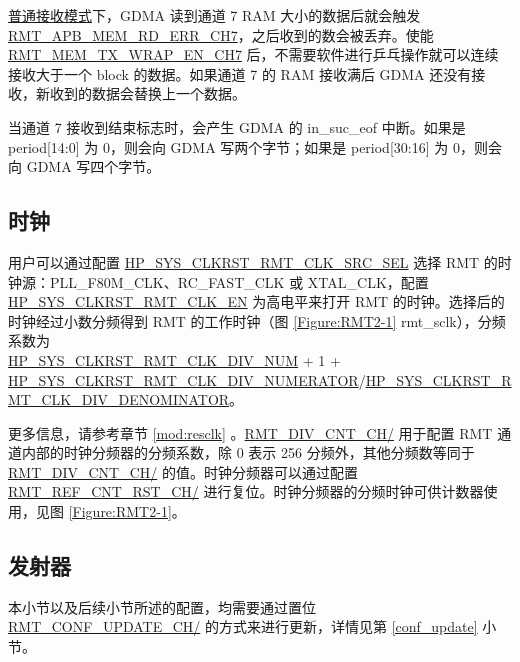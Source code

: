 \documentclass[main\_\_CN.tex]{subfiles}
\begin{document}
\hyperref[sec:normal-rx-mode]{普通接收模式}下，GDMA 读到通道 7 RAM 大小的数据后就会触发 \hyperref[fielddesc:RMTAPBMEMRDERRCHM]{RMT\_APB\_MEM\_RD\_ERR\_CH7}，之后收到的数会被丢弃。使能 \hyperref[fielddesc:RMTMEMRXWRAPENCHM]{RMT\_MEM\_TX\_WRAP\_EN\_CH7} 后，不需要软件进行乒乓操作就可以连续接收大于一个 block 的数据。如果通道 7 的 RAM 接收满后 GDMA 还没有接收，新收到的数据会替换上一个数据。

\begin{tiplisting}
当通道 7 接收到结束标志时，会产生 GDMA 的 in\_suc\_eof 中断。如果是 period[14:0] 为 0，则会向 GDMA 写两个字节；如果是 period[30:16] 为 0，则会向 GDMA 写四个字节。
\end{tiplisting}

\subsection{时钟}\label{clock}


用户可以通过配置 \hyperref[fielddesc:HPSYSCLKRSTRMTCLKSRCSEL]{HP\_SYS\_CLKRST\_RMT\_CLK\_SRC\_SEL} 选择 RMT 的时钟源：PLL\_F80M\_CLK、RC\_FAST\_CLK 或 XTAL\_CLK，配置 \hyperref[fielddesc:HPSYSCLKRSTRMTCLKEN]{HP\_SYS\_CLKRST\_RMT\_CLK\_EN} 为高电平来打开 RMT 的时钟。选择后的时钟经过小数分频得到 RMT 的工作时钟（图 \ref{Figure:RMT2-1} rmt\_sclk），分频系数为\\\hyperref[fielddesc:HPSYSCLKRSTRMTCLKDIVNUM]{HP\_SYS\_CLKRST\_RMT\_CLK\_DIV\_NUM} + 1 +
\hyperref[fielddesc:HPSYSCLKRSTRMTCLKDIVNUMERATOR]{HP\_SYS\_CLKRST\_RMT\_CLK\_DIV\_NUMERATOR}/\hyperref[fielddesc:HPSYSCLKRSTRMTCLKDIVDENOMINATOR]{HP\_SYS\_CLKRST\_RMT\_CLK\_DIV\_DENOMINATOR}。

更多信息，请参考章节 \ref{mod:resclk} \textit{}。\hyperref[fielddesc:RMTDIVCNTCHN]{RMT\_DIV\_CNT\_CH/} 用于配置 RMT 通道内部的时钟分频器的分频系数，除 0 表示 256 分频外，其他分频数等同于 \hyperref[fielddesc:RMTDIVCNTCHN]{RMT\_DIV\_CNT\_CH/} 的值。时钟分频器可以通过配置 \hyperref[fielddesc:RMTREFCNTRSTCHN]{RMT\_REF\_CNT\_RST\_CH/} 进行复位。时钟分频器的分频时钟可供计数器使用，见图 \ref{Figure:RMT2-1}。

\subsection{发射器}

\vspace{1em}
\begin{tiplisting}
本小节以及后续小节所述的配置，均需要通过置位 \hyperref[fielddesc:RMTCONFUPDATECHN]{RMT\_CONF\_UPDATE\_CH/} 的方式来进行更新，详情见第 \ref{conf_update} 小节。
\end{tiplisting}
\vspace{-1em}
\end{document}
